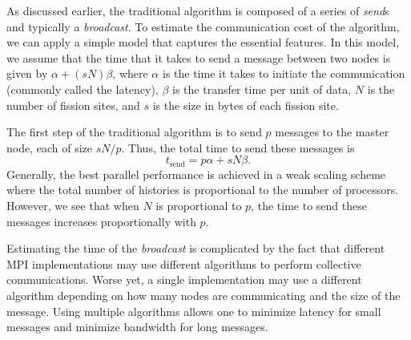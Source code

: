 \documentclass[11pt]{article}
\begin{document}
As discussed earlier, the traditional algorithm is composed of a
series of \emph{send}s and typically a \emph{broadcast}. To estimate
the communication cost of the algorithm, we can apply a simple model
that captures the essential features. In this model, we assume that
the time that it takes to send a message between two nodes is given by
$\alpha + (sN)\beta$, where $\alpha$ is the time it takes to initiate
the communication (commonly called the latency), $\beta$ is the
transfer time per unit of data, $N$ is the number of fission sites,
and $s$ is the size in bytes of each fission site.

The first step of the traditional algorithm is to send $p$ messages to
the master node, each of size $sN/p$. Thus, the total time to send
these messages is
\begin{equation}\label{eq:t-send}
  t_{\text{send}} = p\alpha + sN\beta.
\end{equation}
Generally, the best parallel performance is achieved in a weak scaling
scheme where the total number of histories is proportional to the
number of processors. However, we see that when $N$ is proportional to
$p$, the time to send these messages increases proportionally with
$p$.

Estimating the time of the \emph{broadcast} is complicated by the fact
that different MPI implementations may use different algorithms to
perform collective communications. Worse yet, a single implementation
may use a different algorithm depending on how many nodes are
communicating and the size of the message. Using multiple algorithms
allows one to minimize latency for small messages and minimize
bandwidth for long messages.
\end{document}
